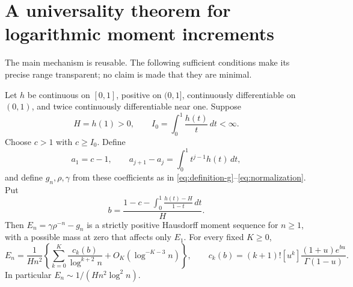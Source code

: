 \section{A universality theorem for logarithmic moment increments}
\label{sec:universality}

The main mechanism is reusable. The following sufficient conditions
make its precise range transparent; no claim is made that they are
minimal.

\begin{theorem}
\label{thm:general-kernel}
Let $h$ be continuous on $[0,1]$, positive on $(0,1]$, continuously
differentiable on $(0,1)$, and twice continuously differentiable near
one. Suppose
\[
 H=h(1)>0,\qquad I_0=\int_0^1\frac{h(t)}t\,dt<\infty.
\]
Choose $c>1$ with $c\ge I_0$. Define
\[
 a_1=c-1,\qquad a_{j+1}-a_j=\int_0^1t^{j-1}h(t)\,dt,
\]
and define $g_n,\rho,\gamma$ from these coefficients as in
\eqref{eq:definition-g}--\eqref{eq:normalization}. Put
\begin{equation}\label{eq:general-beta}
 b=\frac{1-c-\displaystyle\int_0^1
              \frac{h(t)-H}{1-t}\,dt}{H}.
\end{equation}
Then $E_n=\gamma\rho^{-n}-g_n$ is a strictly positive Hausdorff
moment sequence for $n\ge1$, with a possible mass at zero that
affects only $E_1$. For every fixed $K\ge0$,
\begin{equation}\label{eq:general-expansion}
 E_n=\frac1{Hn^2}\left\{
  \sum_{k=0}^K\frac{c_k(b)}{\log^{k+2}n}
             +O_K(\log^{-K-3}n)\right\},
 \qquad
 c_k(b)=(k+1)![u^k]\frac{(1+u)e^{bu}}{\Gamma(1-u)}.
\end{equation}
In particular $E_n\sim1/(Hn^2\log^2n)$.
\end{theorem}


